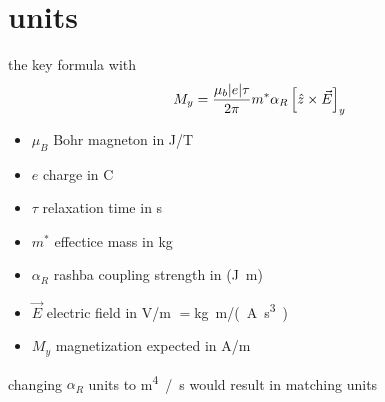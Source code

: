 \documentclass[t,
handout,
]{beamer}
\numberwithin{equation}{section}
\begin{document}
	\section{units}
	
	\begin{frame}{the key formula}
		with
		{\centering
		\begin{equation*}
			M_y = \frac{\mu_b \abs{e} \tau}{2\pi} m^* \alpha_R \left[\hat{z} \times \vec{E}\right]_y
			\end{equation*}}
		
		\begin{itemize}
			\item $\mu_B$ Bohr magneton in \si{\joule /\tesla}
			\item $e$ charge in \si{\coulomb}
			\item $\tau$ relaxation time in \si{\second}
			\item $m^*$ effectice mass in \si{\kilo \gram}
			\item $\alpha_R$ rashba coupling strength in (\si{\joule \meter})
			\item $\vec{E}$ electric field in \si{\volt / \meter } $=$\si{\kilogram \meter / (\ampere \second^3)}
			\item $M_y$ magnetization expected in \si{\ampere/ \meter}
		\end{itemize}
		 
		changing $\alpha_R$ units to \si{\meter^4 /\second} would result in matching units
	\end{frame}

	
%	
\end{document}
